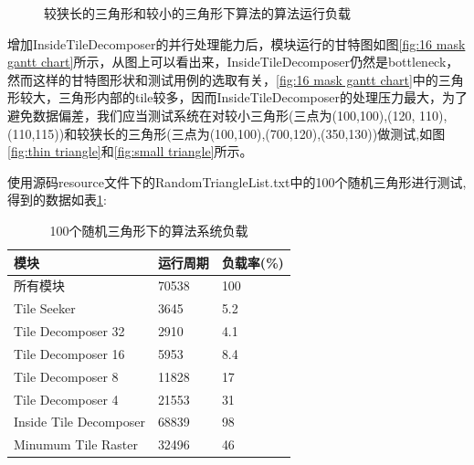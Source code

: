 \begin{figure}[H]
    \centering
    \caption{较狭长的三角形和较小的三角形下算法的算法运行负载}
\end{figure}

增加InsideTileDecomposer的并行处理能力后，模块运行的甘特图如图\ref{fig:16 mask gantt chart}所示，从图上可以看出来，InsideTileDecomposer仍然是bottleneck，然而这样的甘特图形状和测试用例的选取有关，\ref{fig:16 mask gantt chart}中的三角形较大，三角形内部的tile较多，因而InsideTileDecomposer的处理压力最大，为了避免数据偏差，我们应当测试系统在对较小三角形(三点为(100,100),(120, 110),(110,115))和较狭长的三角形(三点为(100,100),(700,120),(350,130))做测试,如图\ref{fig:thin triangle}和\ref{fig:small triangle}所示。

使用源码resource文件下的RandomTriangleList.txt中的100个随机三角形进行测试,得到的数据如表\ref{tab:100 random triangles}:

\begin{table}[ht]
    \caption{\label{tab:100 random triangles}100个随机三角形下的算法系统负载}
    \begin{tabularx}{\linewidth}{|XXX|}
        \hline
        模块 & 运行周期 & 负载率(\%) \\ \hline
        所有模块 & 70538 & 100 \\ \hline
        Tile Seeker & 3645 & 5.2  \\ \hline
        Tile Decomposer 32 & 2910 & 4.1  \\ \hline
        Tile Decomposer 16 & 5953 & 8.4  \\ \hline
        Tile Decomposer 8 & 11828 & 17  \\ \hline
        Tile Decomposer 4 & 21553 & 31  \\ \hline
        Inside Tile Decomposer & 68839 & 98 \\ \hline
        Minumum Tile Raster & 32496 & 46 \\ \hline
    \end{tabularx}
\end{table}




